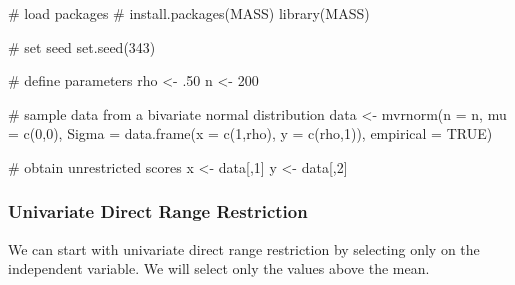 \documentclass[
  letterpaper,
  DIV=11,
  numbers=noendperiod]{scrreprt}
\newenvironment{Shaded}{\begin{snugshade}}{\end{snugshade}}
\newcommand{\AttributeTok}[1]{\textcolor[rgb]{0.40,0.45,0.13}{#1}}
\newcommand{\CommentTok}[1]{\textcolor[rgb]{0.37,0.37,0.37}{#1}}
\newcommand{\ConstantTok}[1]{\textcolor[rgb]{0.56,0.35,0.01}{#1}}
\newcommand{\DecValTok}[1]{\textcolor[rgb]{0.68,0.00,0.00}{#1}}
\newcommand{\FunctionTok}[1]{\textcolor[rgb]{0.28,0.35,0.67}{#1}}
\newcommand{\NormalTok}[1]{\textcolor[rgb]{0.00,0.23,0.31}{#1}}
\newcommand{\OtherTok}[1]{\textcolor[rgb]{0.00,0.23,0.31}{#1}}
\begin{document}
\begin{Shaded}
\begin{Highlighting}[]
\CommentTok{\# load packages}
\CommentTok{\# install.packages(\textquotesingle{}MASS\textquotesingle{})}
\FunctionTok{library}\NormalTok{(MASS)}

\CommentTok{\# set seed}
\FunctionTok{set.seed}\NormalTok{(}\DecValTok{343}\NormalTok{)}

\CommentTok{\# define parameters }
\NormalTok{rho }\OtherTok{\textless{}{-}}\NormalTok{ .}\DecValTok{50}
\NormalTok{n }\OtherTok{\textless{}{-}} \DecValTok{200}

\CommentTok{\# sample data from a bivariate normal distribution}
\NormalTok{data }\OtherTok{\textless{}{-}} \FunctionTok{mvrnorm}\NormalTok{(}\AttributeTok{n =}\NormalTok{ n,}
                \AttributeTok{mu =} \FunctionTok{c}\NormalTok{(}\DecValTok{0}\NormalTok{,}\DecValTok{0}\NormalTok{),}
                \AttributeTok{Sigma =} \FunctionTok{data.frame}\NormalTok{(}\AttributeTok{x =} \FunctionTok{c}\NormalTok{(}\DecValTok{1}\NormalTok{,rho),}
                                  \AttributeTok{y =} \FunctionTok{c}\NormalTok{(rho,}\DecValTok{1}\NormalTok{)),}
                \AttributeTok{empirical =} \ConstantTok{TRUE}\NormalTok{)}

\CommentTok{\# obtain unrestricted scores}
\NormalTok{x }\OtherTok{\textless{}{-}}\NormalTok{ data[,}\DecValTok{1}\NormalTok{]}
\NormalTok{y }\OtherTok{\textless{}{-}}\NormalTok{ data[,}\DecValTok{2}\NormalTok{]}
\end{Highlighting}
\end{Shaded}

\hypertarget{univariate-direct-range-restriction}{%
\subsubsection*{Univariate Direct Range
Restriction}\label{univariate-direct-range-restriction}}

We can start with univariate direct range restriction by selecting only
on the independent variable. We will select only the values above the
mean.
\end{document}
